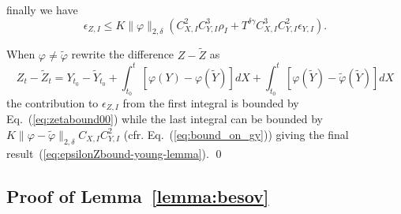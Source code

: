 \documentclass[a4paper,12pt,reqno]{amsproc}
\newcommand{\norm}[1]{\lVert #1\rVert}
\newcommand{\wt}{\widetilde}
\begin{document}
finally we have
\begin{equation}
\label{eq:zetabound00}
  \epsilon_{Z,I} \le K  \norm{\varphi}_{2,\delta}(C_{X,I}^2 C_{Y,I}^3 \rho_I + T^{\delta\gamma} C_{X,I}^3 C_{Y,I}^2 \epsilon_{Y,I}).
 \end{equation}

When $\varphi \neq \wt \varphi$ rewrite the difference $Z-\wt Z$ as
\begin{equation*}
 Z_t-\wt Z_t = Y_{t_0} - \wt Y_{t_0} + \int_{t_0}^t
 [\varphi(Y)-\varphi(\wt Y)] dX + \int_{t_0}^t
 [\varphi(\wt Y)-\wt \varphi(\wt Y)] dX  
\end{equation*}
the contribution to $\epsilon_{Z,I}$ from the first integral is
bounded by  Eq.~(\ref{eq:zetabound00}) while the last integral can be
bounded by $K \norm{\varphi-\wt\varphi}_{2,\delta} C_{X,I} C_{Y,I}^2$
(cfr. Eq.~(\ref{eq:bound_on_gy})) giving the final result~(\ref{eq:epsilonZbound-young-lemma}).
\qed


\subsection{Proof of Lemma~\ref{lemma:besov}}
\label{sec:proof_besov}
\end{document}
